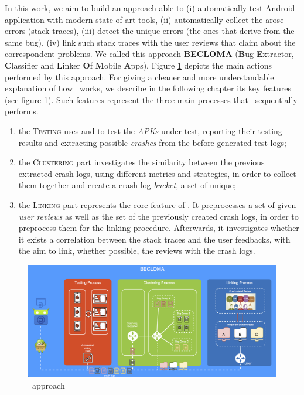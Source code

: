 \label{chapter:approach}
In this work, we aim to build an approach able to (i) automatically test Android application with modern state-of-art tools, (ii) automatically collect the arose errors (\ie stack traces), (iii) detect the unique errors (\ie the ones that derive from the same bug), (iv) link such stack traces with the user reviews that claim about the correspondent problems.           
We called this approach \textbf{BECLOMA} (\textbf{B}ug \textbf{E}xtractor, \textbf{C}lassifier and \textbf{L}inker \textbf{O}f \textbf{M}obile \textbf{A}pps).
Figure \ref{fig: becloma} depicts the main actions performed by this approach.
For giving a cleaner and more understandable explanation of how \toolname\ works, we describe in the following chapter its key features (see figure \ref{fig: becloma}). Such features represent the three main processes that \toolname\ sequentially performs.
\begin{enumerate}
\item the \textsc{Testing} uses \monkey and \sapienz to test the \textit{APKs} under test, reporting their testing results and extracting possible \textit{crashes} from the before generated test logs; 

\item the \textsc{Clustering} part investigates the similarity between the previous extracted crash logs, using different metrics and strategies, in order to collect them together and create a crash log \textit{bucket}, \ie a set of unique; 

\item the \textsc{Linking} part represents the core feature of \toolname. It preprocesses a set of given \textit{user reviews} as well as the set of the previously created crash logs, in order to preprocess them for the linking procedure. Afterwards, it investigates whether it exists a correlation between the stack traces and the user feedbacks, with the aim to link, whether possible, the reviews with the crash logs. 
\end{enumerate}
\begin{figure}[tb]
\centering 
\includegraphics[width=\columnwidth]{diagrams/becloma_approach_img} 
\caption{\toolname\ approach}
\label{fig: becloma}
\end{figure}


